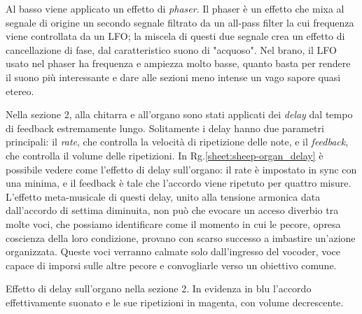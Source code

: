 \documentclass[class=book, crop=false, oneside, 12pt]{standalone}
\begin{document}
    Al basso viene applicato un effetto di \emph{phaser}. Il phaser è un effetto che mixa al segnale di origine un secondo segnale filtrato da un all-pass filter la cui frequenza viene controllata da un LFO; la miscela di questi due segnale crea un effetto di cancellazione di fase, dal caratteristico suono di "acquoso". Nel brano, il LFO usato nel phaser ha frequenza e ampiezza molto basse, quanto basta per rendere il suono più interessante e dare alle sezioni meno intense un vago sapore quasi etereo.

    Nella sezione 2, alla chitarra e all'organo sono stati applicati dei \emph{delay} dal tempo di feedback estremamente lungo. Solitamente i delay hanno due parametri principali: il \emph{rate}, che controlla la velocità di ripetizione delle note, e il \emph{feedback}, che controlla il volume delle ripetizioni. In Rg.\ref{sheet:sheep-organ_delay} è possibile vedere come l'effetto di delay sull'organo: il rate è impostato in sync con una minima, e il feedback è tale che l'accordo viene ripetuto per quattro misure. L'effetto meta-musicale di questi delay, unito alla tensione armonica data dall'accordo di settima diminuita, non può che evocare un acceso diverbio tra molte voci, che possiamo identificare come il momento in cui le pecore, opresa coscienza della loro condizione, provano con scarso successo a imbastire un'azione organizzata. Queste voci verranno calmate solo dall'ingresso del vocoder, voce capace di imporsi sulle altre pecore e convogliarle verso un obiettivo comune.

    \begin{sheet}[htb]
        \centering
        \caption[Effetto di delay sull'organo.]{Effetto di delay sull'organo nella sezione 2. In evidenza in blu l'accordo effettivamente suonato  e le sue ripetizioni in magenta, con volume decrescente.}
        \label{sheet:sheep-organ_delay}
    \end{sheet}

\end{document}
